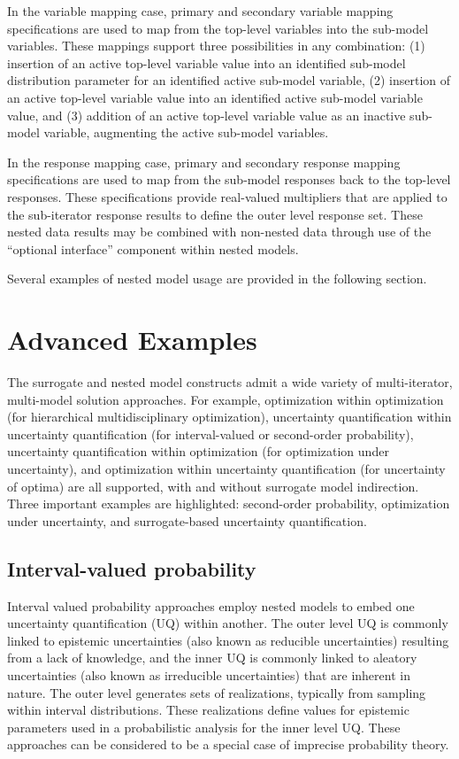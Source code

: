 In the variable mapping case, primary and secondary variable
mapping specifications are used to map from the top-level variables
into the sub-model variables.  These mappings support three
possibilities in any combination: (1) insertion of an active top-level
variable value into an identified sub-model distribution parameter for
an identified active sub-model variable, (2) insertion of an active
top-level variable value into an identified active sub-model variable
value, and (3) addition of an active top-level variable value as an
inactive sub-model variable, augmenting the active sub-model
variables.

In the response mapping case, primary and secondary response
mapping specifications are used to map from the sub-model responses
back to the top-level responses.  These specifications provide
real-valued multipliers that are applied to the sub-iterator response
results to define the outer level response set.  These nested data
results may be combined with non-nested data through use of the 
``optional interface'' component within nested models.

Several examples of nested model usage are provided in the following
section.


\section{Advanced Examples} \label{models:ex}


The surrogate and nested model constructs admit a wide variety of
multi-iterator, multi-model solution approaches.  For example,
optimization within optimization (for hierarchical multidisciplinary
optimization), uncertainty quantification within uncertainty
quantification (for interval-valued or second-order probability), uncertainty
quantification within optimization (for optimization under
uncertainty), and optimization within uncertainty quantification (for
uncertainty of optima) are all supported, with and without surrogate
model indirection.  Three important examples are highlighted:
second-order probability, optimization under uncertainty, and surrogate-based
uncertainty quantification.


\subsection{Interval-valued probability} \label{models:ex:sop}

Interval valued probability approaches employ nested models to embed one
uncertainty quantification (UQ) within another.  The outer level UQ is
commonly linked to epistemic uncertainties (also known as reducible
uncertainties) resulting from a lack of knowledge, and the inner UQ is
commonly linked to aleatory uncertainties (also known as irreducible
uncertainties) that are inherent in nature. The outer level generates
sets of realizations, typically from sampling within interval
distributions.  These realizations define values for epistemic 
parameters used in a probabilistic analysis for the inner level UQ.
These approaches can be considered to be a special case of imprecise
probability theory.

